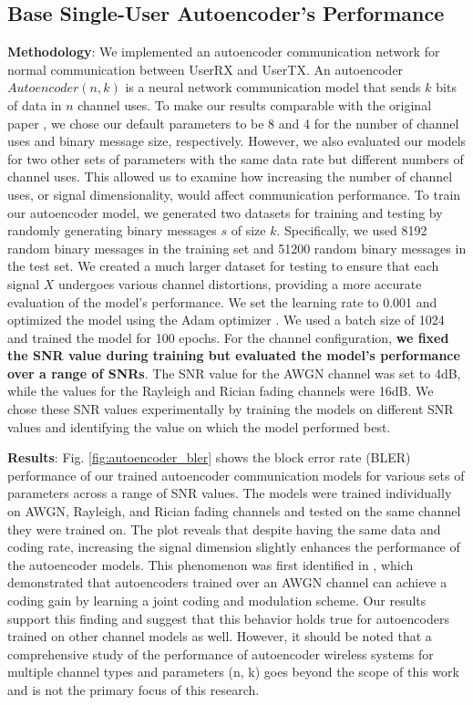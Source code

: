 \subsection{Base Single-User Autoencoder's Performance}
\textbf{Methodology}: We implemented an autoencoder communication network for normal communication between UserRX and UserTX. An autoencoder \(Autoencoder (n, k)\) is a neural network communication model that sends \(k\) bits of data in \(n\) channel uses. To make our results comparable with the original paper \cite{o2017introduction}, we chose our default parameters to be 8 and 4 for the number of channel uses and binary message size, respectively. However, we also evaluated our models for two other sets of parameters with the same data rate but different numbers of channel uses. This allowed us to examine how increasing the number of channel uses, or signal dimensionality, would affect communication performance. To train our autoencoder model, we generated two datasets for training and testing by randomly generating binary messages \(s\) of size \(k\). Specifically, we used 8192 random binary messages in the training set and 51200 random binary messages in the test set. We created a much larger dataset for testing to ensure that each signal \(X\) undergoes various channel distortions, providing a more accurate evaluation of the model's performance. We set the learning rate to 0.001 and optimized the model using the Adam optimizer \cite{kingma2014adam}. We used a batch size of 1024 and trained the model for 100 epochs. For the channel configuration, \textbf{we fixed the SNR value during training but evaluated the model's performance over a range of SNRs}. The SNR value for the AWGN channel was set to 4dB, while the values for the Rayleigh and Rician fading channels were 16dB. We chose these SNR values experimentally by training the models on different SNR values and identifying the value on which the model performed best.

\textbf{Results}: Fig. \ref{fig:autoencoder_bler} shows the block error rate (BLER) performance of our trained autoencoder communication models for various sets of parameters across a range of SNR values. The models were trained individually on AWGN, Rayleigh, and Rician fading channels and tested on the same channel they were trained on.
The plot reveals that despite having the same data and coding rate, increasing the signal dimension slightly enhances the performance of the autoencoder models. This phenomenon was first identified in \cite{o2017introduction}, which demonstrated that autoencoders trained over an AWGN channel can achieve a coding gain by learning a joint coding and modulation scheme. Our results support this finding and suggest that this behavior holds true for autoencoders trained on other channel models as well. However, it should be noted that a comprehensive study of the performance of autoencoder wireless systems for multiple channel types and parameters (n, k) goes beyond the scope of this work and is not the primary focus of this research.


